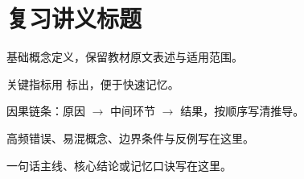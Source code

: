 \documentclass[11pt,a4paper]{article}
\begin{document}
\section*{复习讲义标题}


基础概念定义，保留教材原文表述与适用范围。

关键指标用  标出，便于快速记忆。

\begin{mechbox}
  因果链条：原因 \(\to\) 中间环节 \(\to\) 结果，按顺序写清推导。
\end{mechbox}

\begin{trapbox}
  高频错误、易混概念、边界条件与反例写在这里。
\end{trapbox}

\begin{conclbox}
  一句话主线、核心结论或记忆口诀写在这里。
\end{conclbox}

\end{document}
